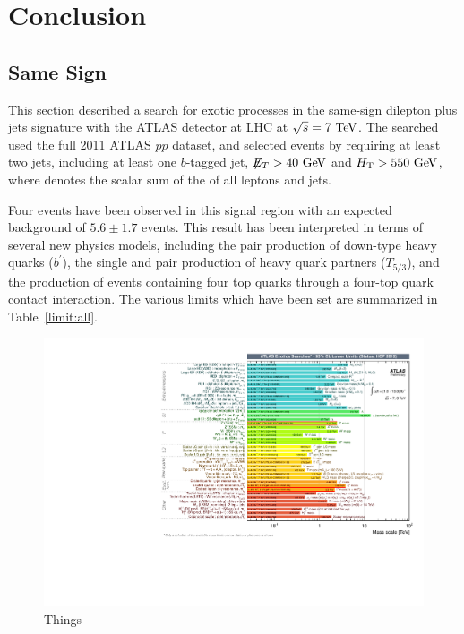

\chapter{Conclusion}



\section{Same Sign}\label{sect:conclusion}

This section described a search for exotic processes in the same-sign dilepton plus jets signature with the ATLAS detector at LHC at $\sqrt{s}=7 \TeV$.
The searched used the full 2011 ATLAS $pp$ dataset, and selected events by requiring at least two jets, including at least one $b$-tagged jet, $\met>40 \GeV$ and $\HT>550 \GeV$, where \HT{} denotes the scalar sum of the \pT{} of all leptons and jets. 

Four events have been observed in this signal region with an expected background of $5.6\pm1.7$ events. 
This result has been interpreted in terms of several new physics models, including the pair production of down-type heavy quarks ($b^\prime$), the single and pair production of heavy quark partners ($T_{5/3}$), and the production of events containing four top quarks through a four-top quark contact interaction. 
The various limits which have been set are summarized in Table~\ref{limit:all}.



\begin{figure}[ht!]
  \begin{center}
    \includegraphics[width=.95\textwidth]{figures/conclusion/ExoticResultsSummary}
    \caption{Things}
    \label{fig:xsec_vs_roots}
  \end{center}
\end{figure}


